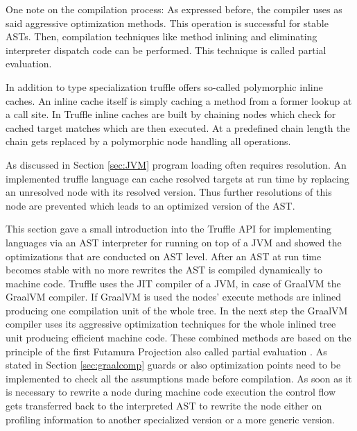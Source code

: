 One note on the compilation process: As expressed before, the compiler uses as said aggressive optimization methods. This operation is successful for stable ASTs. Then, compilation techniques like method inlining and eliminating interpreter dispatch code can be performed. This technique is called partial evaluation.

In addition to type specialization truffle offers so-called polymorphic inline caches. \cite{ChambOpti} An inline cache itself is simply caching a method from a former lookup at a call site. In Truffle inline caches are built by chaining nodes which check for cached target matches which are then executed. At a predefined chain length the chain gets replaced by a polymorphic node handling all operations.

As discussed in Section \ref{sec:JVM} program loading often requires resolution. An implemented truffle language can cache resolved targets at run time by replacing an unresolved node with its resolved version. Thus further resolutions of this node are prevented which leads to an optimized version of the AST.

This section gave a small introduction into the Truffle API for implementing languages via an AST interpreter for running on top of a JVM and showed the optimizations that are conducted on AST level. After an AST at run time becomes stable with no more rewrites the AST is compiled dynamically to machine code. Truffle uses the JIT compiler of a JVM, in case of GraalVM the GraalVM compiler. If GraalVM is used the nodes' execute methods are inlined producing one compilation unit of the whole tree. In the next step the GraalVM compiler uses its aggressive optimization techniques for the whole inlined tree unit producing efficient machine code. These combined methods are based on the principle of the first Futamura Projection also called partial evaluation \cite{FutaPart}. As stated in Section \ref{sec:graalcomp} guards or also optimization points need to be implemented to check all the assumptions made before compilation. As soon as it is necessary to rewrite a node during machine code execution the control flow gets transferred back to the interpreted AST to rewrite the node either on profiling information to another specialized version or a more generic version. \cite{ChambDeopt}


